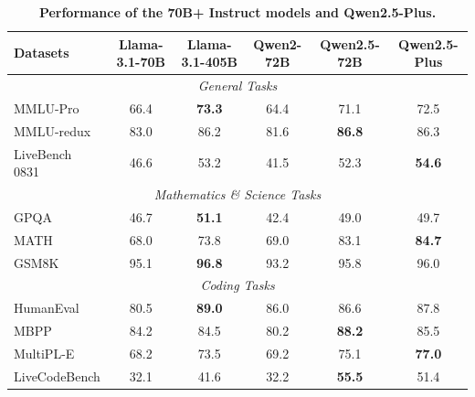 \documentclass{article}
\begin{document}
\begin{table}[tbp]

\centering

\caption{\textbf{Performance of the 70B+ Instruct models and Qwen2.5-Plus.}}

\label{tab:70b_instruct}
\small
\setlength{\tabcolsep}{2.6pt}

\begin{tabular}{@{}lccccc@{}}

\toprule

\textbf{Datasets}  & \textbf{Llama-3.1-70B} & \textbf{Llama-3.1-405B} & \textbf{Qwen2-72B} & \textbf{Qwen2.5-72B} & \textbf{Qwen2.5-Plus} \\

\midrule

\multicolumn{6}{c}{\textit{General Tasks}} \\
\midrule

MMLU-Pro  & 66.4 & \textbf{73.3} & 64.4 & 71.1 & 72.5 \\

MMLU-redux  & 83.0 & 86.2 & 81.6 & \textbf{86.8} & 86.3\\

LiveBench 0831  & 46.6 & 53.2 & 41.5 & 52.3 & \textbf{54.6}\\

\midrule
\multicolumn{6}{c}{\textit{Mathematics \& Science Tasks}} \\
\midrule

GPQA   & 46.7 & \textbf{51.1} & 42.4 & 49.0 & 49.7\\

MATH   & 68.0 & 73.8 & 69.0 & 83.1 & \textbf{84.7}\\

GSM8K  & 95.1 & \textbf{96.8} & 93.2 & 95.8 & 96.0\\

\midrule
\multicolumn{6}{c}{\textit{Coding Tasks}} \\
\midrule

HumanEval  & 80.5 & \textbf{89.0} & 86.0 & 86.6 & 87.8\\

MBPP  & 84.2 & 84.5 & 80.2 & \textbf{88.2} & 85.5\\

MultiPL-E  & 68.2 & 73.5 & 69.2 & 75.1 & \textbf{77.0}  \\

LiveCodeBench  & 32.1 & 41.6 & 32.2 & \textbf{55.5} & 51.4\\


\end{tabular}
\end{table}
\end{document}
